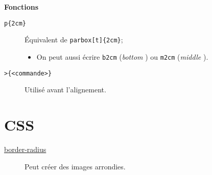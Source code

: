\documentclass[10pt, french]{article}
\begin{document}
\begin{multicols*}{2}
\begin{algo2}[array]
\textbf{Fonctions}
\begin{description}
	\item[\texttt{p\{2cm\}}]	Équivalent de \texttt{parbox[t]\{2cm\}};
		\begin{itemize}
		\item	On peut aussi écrire \texttt{b{2cm}} (\og \textit{bottom} \fg{}) ou \texttt{m{2cm}} (\og \textit{middle} \fg{}).
		\end{itemize}
	\item[\texttt{>\{<commande>\}}]	Utilisé avant l'alignement.
\end{description}
\end{algo2}


\newpage

\section{CSS}

\begin{algo2}[images]
\begin{description}
    \item[\href{https://www.w3schools.com/css/css3_images.asp}{border-radius}]  Peut créer des images arrondies.
\end{description}
\end{algo2}

\end{multicols*}
\end{document}
